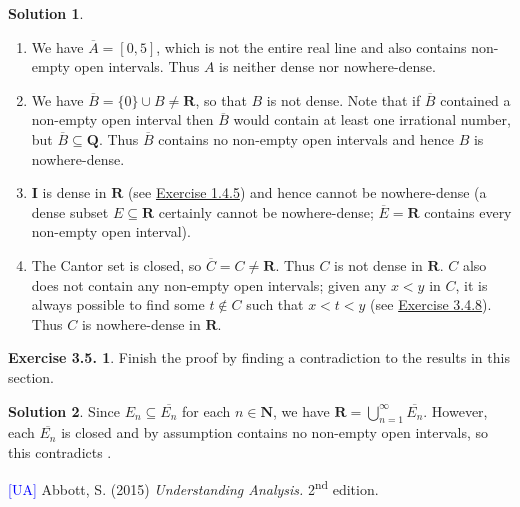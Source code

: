 \documentclass[12pt]{article}
\theoremstyle{definition}
\theoremstyle{exercise}
\newtheorem{exercise}{Exercise 3.5.}
\theoremstyle{solution}
\newtheorem*{solution}{Solution}
\newcommand{\ts}{\textsuperscript}
\newcommand{\N}{\mathbf{N}}
\newcommand{\Q}{\mathbf{Q}}
\newcommand{\I}{\mathbf{I}}
\newcommand{\R}{\mathbf{R}}
\begin{document}
\begin{solution}
    \begin{enumerate}
        \item We have \( \overline{A} = [0, 5] \), which is not the entire real line and also contains non-empty open intervals. Thus \( A \) is neither dense nor nowhere-dense.

        \item We have \( \overline{B} = \{ 0 \} \cup B \neq \R \), so that \( B \) is not dense. Note that if \( \overline{B} \) contained a non-empty open interval then \( \overline{B} \) would contain at least one irrational number, but \( \overline{B} \subseteq \Q \). Thus \( \overline{B} \) contains no non-empty open intervals and hence \( B \) is nowhere-dense.

        \item \( \I \) is dense in \( \R \) (see \href{https://lew98.github.io/Mathematics/UA_Section_1_4_Exercises.pdf}{Exercise 1.4.5}) and hence cannot be nowhere-dense (a dense subset \( E \subseteq \R \) certainly cannot be nowhere-dense; \( \overline{E} = \R \) contains every non-empty open interval).

        \item The Cantor set is closed, so \( \overline{C} = C \neq \R \). Thus \( C \) is not dense in \( \R \). \( C \) also does not contain any non-empty open intervals; given any \( x < y \) in \( C \), it is always possible to find some \( t \not\in C \) such that \( x < t < y \) (see \href{https://lew98.github.io/Mathematics/UA_Section_3_4_Exercises.pdf}{Exercise 3.4.8}). Thus \( C \) is nowhere-dense in \( \R \).
    \end{enumerate}
\end{solution}

\begin{exercise}
\label{ex:10}
    Finish the proof by finding a contradiction to the results in this section.
\end{exercise}

\begin{solution}
    Since \( E_n \subseteq \overline{E_n} \) for each \( n \in \N \), we have \( \R = \bigcup_{n=1}^{\infty} \overline{E_n} \). However, each \( \overline{E_n} \) is closed and by assumption contains no non-empty open intervals, so this contradicts .
\end{solution}

\noindent \hrulefill

\noindent \hypertarget{ua}{\textcolor{blue}{[UA]} Abbott, S. (2015) \textit{Understanding Analysis.} 2\ts{nd} edition.}
\end{document}
